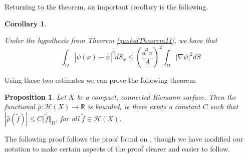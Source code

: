 \documentclass[11pt]{report}
\newtheorem{prop}[thm]{Proposition}
\newtheorem{cor}[thm]{Corollary}
\theoremstyle{definition}
\begin{document}
Returning to the theorem, an important corollary is the following.
\begin{cor}\cite[(p123. Corollary 6)]{donaldson}\label{quotedCorollary6}

  Under the hypothesis from Theorem \ref{quotedTheorem11}, we have that 
  \[\int_\Omega |\psi(x) - \overline{\psi}|^2 dS_x\leq \left(\frac{d^3\pi}{A}\right)^2\int_\Omega |\nabla\psi|^2 dS\]
\end{cor}
Using these two estimates we can prove the following theorem.
\begin{prop}\label{PartitionOfUnity}
  Let $X$ be a compact, connected Riemann surface. Then the functional $\hat{\rho}:\mathcal{H}(X) \rightarrow \mathbb{R}$ is bounded, ie there exists a constant $C$ such that $|\hat{\rho}(\tilde{f})| \leq C \Vert \tilde{f} \Vert_D$, for all $\tilde{f} \in \mathcal{H}(X)$.
\end{prop}
The following proof follows the proof found on \cite[p.125]{donaldson}, though we have modified our notation to make certain aspects of the proof clearer and easier to follow.
\end{document}

